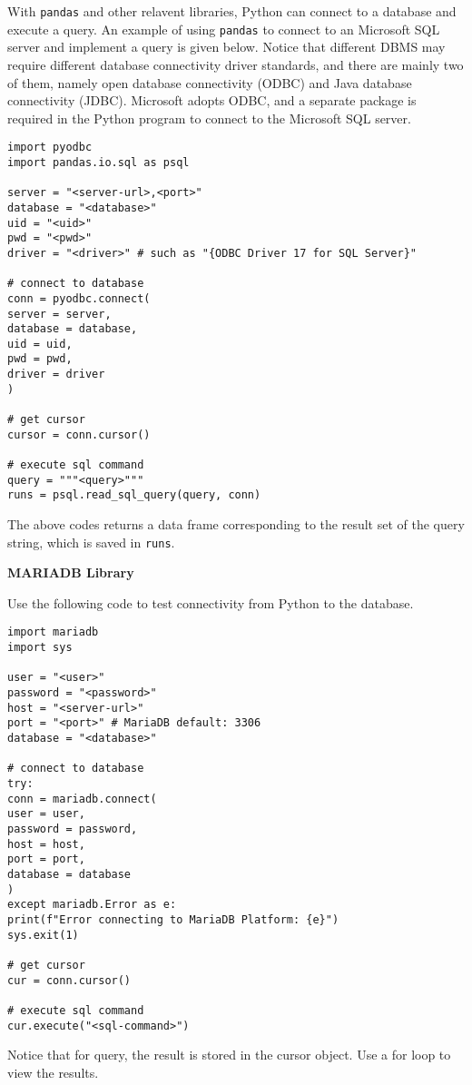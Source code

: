 With \verb|pandas| and other relavent libraries, Python can connect to a database and execute a query. An example of using \verb|pandas| to connect to an Microsoft SQL server and implement a query is given below. Notice that different DBMS may require different database connectivity driver standards, and there are mainly two of them, namely open database connectivity (ODBC) and Java database connectivity (JDBC). Microsoft adopts ODBC, and a separate package is required in the Python program to connect to the Microsoft SQL server.
\begin{lstlisting}
import pyodbc
import pandas.io.sql as psql

server = "<server-url>,<port>"
database = "<database>"
uid = "<uid>"
pwd = "<pwd>"
driver = "<driver>" # such as "{ODBC Driver 17 for SQL Server}"

# connect to database
conn = pyodbc.connect(
server = server,
database = database,
uid = uid,
pwd = pwd,
driver = driver
)

# get cursor
cursor = conn.cursor()

# execute sql command
query = """<query>"""
runs = psql.read_sql_query(query, conn)
\end{lstlisting}
The above codes returns a data frame corresponding to the result set of the query string, which is saved in \verb|runs|.

\vspace{0.1in}
\noindent \textbf{MARIADB Library}
\vspace{0.1in}

Use the following code to test connectivity from Python to the database.
\begin{lstlisting}
import mariadb
import sys

user = "<user>"
password = "<password>"
host = "<server-url>"
port = "<port>" # MariaDB default: 3306
database = "<database>"

# connect to database
try:
conn = mariadb.connect(
user = user,
password = password,
host = host,
port = port,
database = database
)
except mariadb.Error as e:
print(f"Error connecting to MariaDB Platform: {e}")
sys.exit(1)

# get cursor
cur = conn.cursor()

# execute sql command
cur.execute("<sql-command>")
\end{lstlisting}
Notice that for query, the result is stored in the cursor object. Use a for loop to view the results.


